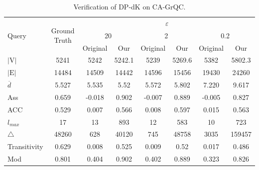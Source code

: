 \documentclass[conference]{IEEEtran}
\theoremstyle{plain}
\begin{document}
\begin{table}[t]
\small
	\caption{Verification of DP-dK on CA-GrQC.}
	\centering
	\label{tab:DP-dK verification}
	\begin{tabular}{|l|c|c|c|c|c|c|c|}
			\hline
      \multirow{3}{*}{Query} & \multirow{3}{*}{Ground Truth}& \multicolumn{6}{c|}{$\varepsilon$}\\
    \cline{3-8}
    & & \multicolumn{2}{c|}{20} & \multicolumn{2}{c|}{2} &  \multicolumn{2}{c|}{0.2} \\ \cline{3-8}
    & & Original & Our & Original & Our & Original & Our \\
\hline
   $|\text{V}|$ & 5241 & 5242 & 5242.1 & 5239 & 5269.6 & 5382 & 5802.3 \\ \hline
   $|\text{E}|$ & 14484 & 14509 & 14442 & 14596 & 15456 & 19430 & 24260 \\ \hline
   $\overline{d}$ & 5.527 & 5.535 & 5.52 & 5.572 & 5.802 & 7.220 & 9.617 \\ \hline
   Ass & 0.659 & -0.018 & 0.902 & -0.007 & 0.889 & -0.005 & 0.827 \\ \hline
   ACC & 0.529 & 0.007 & 0.566 & 0.008 & 0.597 & 0.015 & 0.563 \\ \hline
   $l_{max}$ & 17 & 13 & 893 & 12 & 583 & 10 & 723 \\ \hline
   $\triangle$ & 48260 & 628 & 40120 & 745 & 48758 & 3035 & 159457 \\ \hline
   Transitivity & 0.629 & 0.008 & 0.525 & 0.009 & 0.52 & 0.017 & 0.486 \\ \hline
   Mod & 0.801 & 0.404 & 0.902 & 0.402 & 0.889 & 0.323 & 0.826 \\ \hline
    
\end{tabular}
     \vspace{-10pt}
\end{table}
\end{document}
